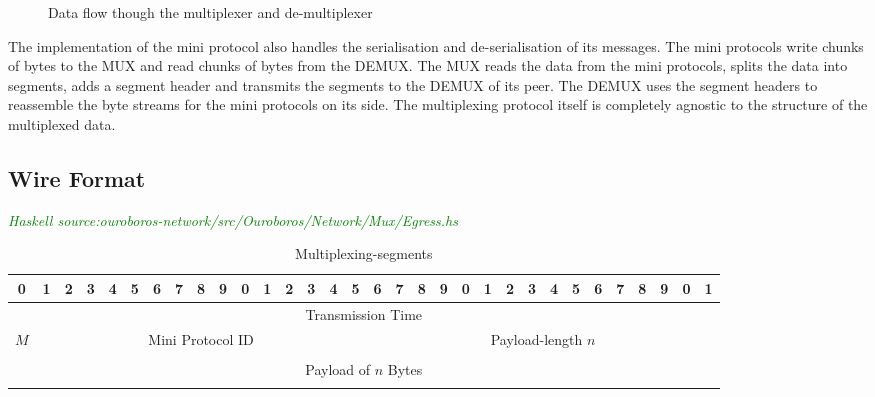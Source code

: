 \documentclass{report}
\newcommand{\hsref}[1]{{\textcolor{green}{\emph{Haskell source:#1}}}}
\theoremstyle{definition}{
  \newtheorem{lemma}{Lemma}[section] %
  \newtheorem{definition}[lemma]{Definition}
}
\theoremstyle{theorem}{
  \newtheorem{invariant}[lemma]{Invariant}
  \newtheorem{proofobligation}[lemma]{Proof Obligation}
}
\numberwithin{equation}{lemma}
\begin{document}
\begin{figure}[h]
\begin{center}
\end{center}
\caption{Data flow though the multiplexer and de-multiplexer}
\label{mux-diagram}
\end{figure}

The implementation of the mini protocol also handles the serialisation and de-serialisation of its messages.
The mini protocols write chunks of bytes to the MUX and read chunks of bytes from the DEMUX.
The MUX reads the data from the mini protocols, splits the data into segments, adds a segment header
and transmits the segments to the DEMUX of its peer.
The DEMUX uses the segment headers to reassemble the byte streams for the mini protocols on its side.
The multiplexing protocol itself is completely agnostic to the structure of the multiplexed data.

\subsection{Wire Format}
\hsref{ouroboros-network/src/Ouroboros/Network/Mux/Egress.hs}
\begin{table}[h]
\centering
\begingroup
\setlength{\tabcolsep}{3pt}
\begin{tabular}{|c|c|c|c|c|c|c|c|c|c|c|c|c|c|c|c|c|c|c|c|c|c|c|c|c|c|c|c|c|c|c|c|}
  \hline
  0&1&2&3&4&5&6&7&8&9&0&1&2&3&4&5&6&7&8&9&0&1&2&3&4&5&6&7&8&9&0&1 \\ \hline
  \multicolumn{32}{|c|}{Transmission Time} \\ \hline
  \multicolumn{1}{|c|}{$M$}
  &\multicolumn{15}{|c|}{Mini Protocol ID}
  &\multicolumn{16}{|c|}{Payload-length $n$} \\ \hline
  \multicolumn{32}{|c|}{} \\
  \multicolumn{32}{|c|}{Payload of $n$ Bytes} \\
  \multicolumn{32}{|c|}{} \\ \hline
\end{tabular}
\endgroup
\caption{Multiplexing-segments}
\label{segment-header}
\end{table}
\end{document}
